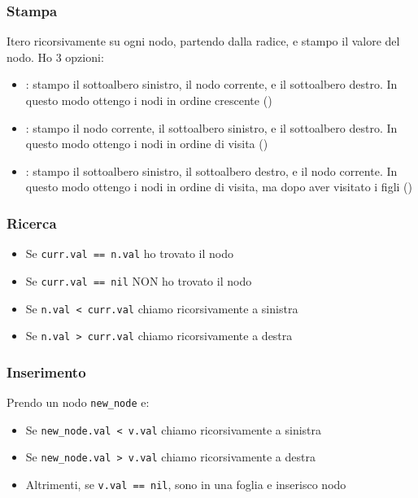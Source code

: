\subsubsection{Stampa}
Itero ricorsivamente su ogni nodo, partendo dalla radice, e stampo il valore del nodo.
Ho 3 opzioni:
\begin{itemize}
	\item {}: stampo il sottoalbero sinistro, il nodo corrente, e il sottoalbero destro. In questo modo ottengo i nodi in ordine crescente ()
	\item {}: stampo il nodo corrente, il sottoalbero sinistro, e il sottoalbero destro. In questo modo ottengo i nodi in ordine di visita ()
	\item {}: stampo il sottoalbero sinistro, il sottoalbero destro, e il nodo corrente. In questo modo ottengo i nodi in ordine di visita, ma dopo aver visitato i figli ()
\end{itemize}
\subsubsection{Ricerca}\label{bt ricerca}
\begin{itemize}
	\item Se \verb|curr.val == n.val| ho trovato il nodo
	\item Se \verb|curr.val == nil| NON ho trovato il nodo
	\item Se \verb|n.val < curr.val| chiamo ricorsivamente a sinistra
	\item Se \verb|n.val > curr.val| chiamo ricorsivamente a destra
\end{itemize}

\subsubsection{Inserimento}
Prendo un nodo \verb|new_node| e:
\begin{itemize}
	\item Se \verb|new_node.val < v.val|  chiamo ricorsivamente a sinistra
	\item Se \verb|new_node.val > v.val|  chiamo ricorsivamente a destra
	\item Altrimenti, se \verb|v.val == nil|, sono in una foglia e inserisco nodo
\end{itemize}

